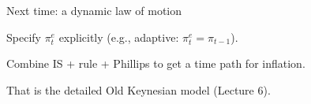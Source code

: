 \documentclass[aspectratio=169,xcolor=dvipsnames]{beamer}
\let\tempone\itemize
\let\temptwo\enditemize
\renewenvironment{itemize}{\tempone\addtolength{\itemsep}{\fill}}{\temptwo}
\begin{document}
\begin{frame}{Next time: a dynamic law of motion}
\begin{itemize}
\item Specify $\pi_t^e$ explicitly (e.g., adaptive: $\pi_t^e=\pi_{t-1}$).
\item Combine IS + rule + Phillips to get a time path for inflation.
\item That is the detailed Old Keynesian model (Lecture 6).
\end{itemize}
\end{frame}
\end{document}
